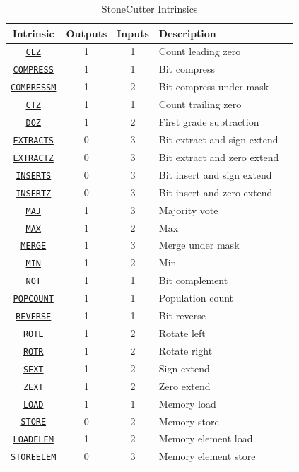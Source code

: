 \documentclass{article}
\begin{document}
\begin{table}[h]
\begin{center}
\caption{StoneCutter Intrinsics}
\vspace{0.125in}
\label{tab:scintrins}
\begin{tabular}{|c|c|c|l|l}
\hline
\textbf{Intrinsic} & \textbf{Outputs} & \textbf{Inputs} & \textbf{Description}\\
\hline
\hyperref[sec:CLZ]{\texttt{CLZ}} & 1 & 1 & Count leading zero\\
\hline
\hyperref[sec:COMPRESS]{\texttt{COMPRESS}} & 1 & 1 & Bit compress\\
\hline
\hyperref[sec:COMPRESSM]{\texttt{COMPRESSM}} & 1 & 2 & Bit compress under mask\\
\hline
\hyperref[sec:CTZ]{\texttt{CTZ}} & 1 & 1 & Count trailing zero\\
\hline
\hyperref[sec:DOZ]{\texttt{DOZ}} & 1 & 2 & First grade subtraction\\
\hline
\hyperref[sec:EXTRACTS]{\texttt{EXTRACTS}} & 0 & 3 & Bit extract and sign extend\\
\hline
\hyperref[sec:EXTRACTZ]{\texttt{EXTRACTZ}} & 0 & 3 & Bit extract and zero extend\\
\hline
\hyperref[sec:INSERTS]{\texttt{INSERTS}} & 0 & 3 & Bit insert and sign extend\\
\hline
\hyperref[sec:INSERTZ]{\texttt{INSERTZ}} & 0 & 3 & Bit insert and zero extend\\
\hline
\hyperref[sec:MAJ]{\texttt{MAJ}} & 1 & 3 & Majority vote\\
\hline
\hyperref[sec:MAX]{\texttt{MAX}} & 1 & 2 & Max\\
\hline
\hyperref[sec:MERGE]{\texttt{MERGE}} & 1 & 3 & Merge under mask\\
\hline
\hyperref[sec:MIN]{\texttt{MIN}} & 1 & 2 & Min\\
\hline
\hyperref[sec:NOT]{\texttt{NOT}} & 1 & 1 & Bit complement\\
\hline
\hyperref[sec:POPCOUNT]{\texttt{POPCOUNT}} & 1 & 1 & Population count\\
\hline
\hyperref[sec:REVERSE]{\texttt{REVERSE}} & 1 & 1 & Bit reverse\\
\hline
\hyperref[sec:ROTL]{\texttt{ROTL}} & 1 & 2 & Rotate left\\
\hline
\hyperref[sec:ROTR]{\texttt{ROTR}} & 1 & 2 & Rotate right\\
\hline
\hyperref[sec:SEXT]{\texttt{SEXT}} & 1 & 2 & Sign extend\\
\hline
\hyperref[sec:ZEXT]{\texttt{ZEXT}} & 1 & 2 & Zero extend\\
\hline
\hyperref[sec:LOAD]{\texttt{LOAD}} & 1 & 1 & Memory load\\
\hline
\hyperref[sec:STORE]{\texttt{STORE}} & 0 & 2 & Memory store\\
\hline
\hyperref[sec:LOADELEM]{\texttt{LOADELEM}} & 1 & 2 & Memory element load\\
\hline
\hyperref[sec:STOREELEM]{\texttt{STOREELEM}} & 0 & 3 & Memory element store\\
\hline
\end{tabular}
\end{center}
\end{table}
\end{document}

